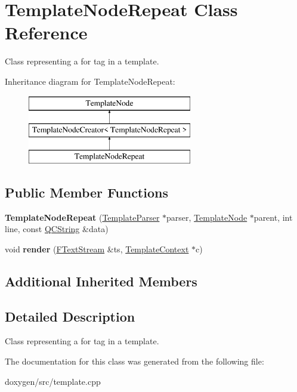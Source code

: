\hypertarget{class_template_node_repeat}{}\section{Template\+Node\+Repeat Class Reference}
\label{class_template_node_repeat}


Class representing a \textquotesingle{}for\textquotesingle{} tag in a template.  


Inheritance diagram for Template\+Node\+Repeat\+:\begin{figure}[H]
\begin{center}
\leavevmode
\includegraphics[height=3.000000cm]{class_template_node_repeat}
\end{center}
\end{figure}
\subsection*{Public Member Functions}
\begin{DoxyCompactItemize}
\item 
\mbox{\label{class_template_node_repeat_a2375c0b5d57a0efd46bfb0f49f9191fb}} 
{\bfseries Template\+Node\+Repeat} (\mbox{\hyperlink{class_template_parser}{Template\+Parser}} $\ast$parser, \mbox{\hyperlink{class_template_node}{Template\+Node}} $\ast$parent, int line, const \mbox{\hyperlink{class_q_c_string}{Q\+C\+String}} \&data)
\item 
\mbox{\label{class_template_node_repeat_a07160af252e718da305d5c3e34346422}} 
void {\bfseries render} (\mbox{\hyperlink{class_f_text_stream}{F\+Text\+Stream}} \&ts, \mbox{\hyperlink{class_template_context}{Template\+Context}} $\ast$c)
\end{DoxyCompactItemize}
\subsection*{Additional Inherited Members}


\subsection{Detailed Description}
Class representing a \textquotesingle{}for\textquotesingle{} tag in a template. 

The documentation for this class was generated from the following file\+:\begin{DoxyCompactItemize}
\item 
doxygen/src/template.\+cpp\end{DoxyCompactItemize}
